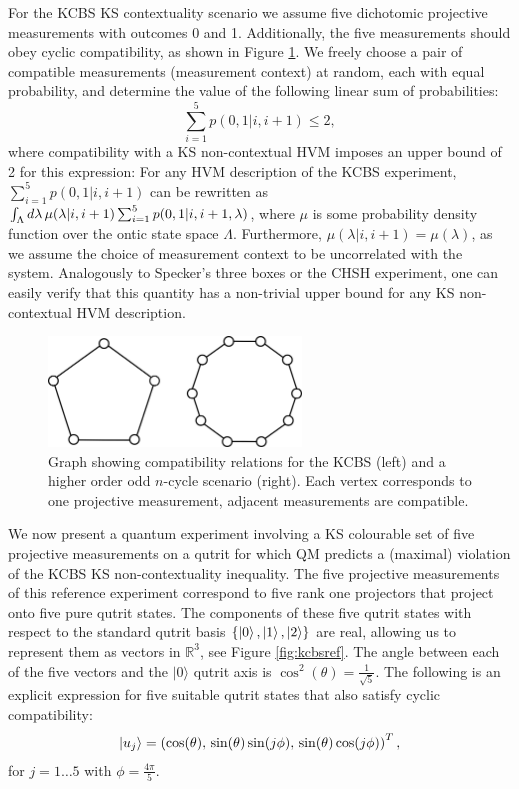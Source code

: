 For the KCBS KS contextuality scenario we assume five dichotomic projective measurements with outcomes 0 and 1. Additionally, the five measurements should obey cyclic compatibility, as shown in Figure \ref{fig:kcbscompat}. We freely choose a pair of compatible measurements (measurement context) at random, each with equal probability, and determine the value of the following linear sum of probabilities:
\begin{equation*}
    \sum_{i=1}^5 p(0,1\vert i, i+1)\leq 2,
\end{equation*}
where compatibility with a KS non-contextual HVM imposes an upper bound of 2 for this expression: For any HVM description of the KCBS experiment, $\sum_{i=1}^5 p(0,1\vert i,i+1)$ can be rewritten as $\int_{\Lambda}d\lambda\thinspace\mu(\lambda\vert i,i+1)\sum_{i=1}^5 p(0,1\vert i, i+1, \lambda)$, where $\mu$ is some probability density function over the ontic state space $\Lambda$. Furthermore, $\mu(\lambda\vert i,i+1)=\mu(\lambda)$, as we assume the choice of measurement context to be uncorrelated with the system. Analogously to Specker's three boxes or the CHSH experiment, one can easily verify that this quantity has a non-trivial upper bound for any KS non-contextual HVM description.

\begin{figure}
    \centering
    \includegraphics[width=0.6\textwidth]{images/kcbscompat.png}
    \caption{Graph showing compatibility relations for the KCBS (left) and a higher order odd $n$-cycle scenario (right). Each vertex corresponds to one projective measurement, adjacent measurements are compatible.}
    \label{fig:kcbscompat}
\end{figure}

We now present a quantum experiment involving a KS colourable set of five projective measurements on a qutrit for which QM predicts a (maximal) violation of the KCBS KS non-contextuality inequality. The five projective measurements of this reference experiment correspond to five rank one projectors that project onto five pure qutrit states. The components of these five qutrit states with respect to the standard qutrit basis $\{\ket{0}, \ket{1}, \ket{2}\}$ are real, allowing us to represent them as vectors in $\mathbb{R}^3$, see Figure \ref{fig:kcbsref}. The angle between each of the five vectors and the $\vert 0\rangle$ qutrit axis is $\cos^2(\theta)=\frac{1}{\sqrt{5}}$. The following is an explicit expression for five suitable qutrit states that also satisfy cyclic compatibility:
\begin{align*}
    \ket{u_j} = \left(\cos(\theta),\thinspace\sin(\theta)\sin(j\phi),\thinspace\sin(\theta)\cos(j\phi)\right)^T,
\end{align*}
for $\displaystyle j=1\dots 5$ with $\displaystyle\phi=\frac{4\pi}{5}$.

